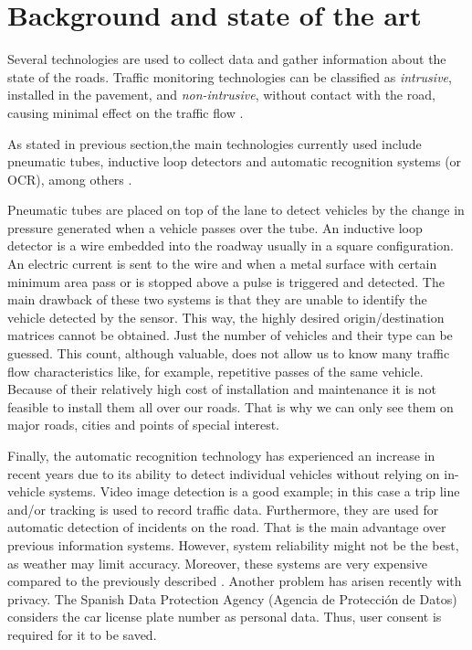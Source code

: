 \documentclass[preprint]{elsarticle}
\begin{document}


\section{Background and state of the art}
\label{sec:soa}

Several technologies are used to collect data and gather information about the 
state of the roads. Traffic monitoring technologies can be classified as 
\textit{intrusive}, installed in the pavement, and
\textit{non-intrusive}, without contact with the road, causing minimal
effect on the traffic flow \cite{martin2003detector}. 

As stated in previous section,the main technologies currently used include pneumatic tubes, inductive loop detectors and automatic recognition systems (or OCR), among others \cite{rodrigue2013geography}.

Pneumatic tubes are placed on top of the lane to detect vehicles by the change 
in pressure generated when a vehicle passes over the tube. 
An inductive loop detector is a wire embedded into the roadway usually
in a square configuration. An electric current is sent to the wire and
when a metal surface with certain minimum area pass or is stopped
above a pulse is triggered and detected. The main drawback of these
two systems is that they are unable to identify the vehicle detected
by the sensor. This way, the highly desired origin/destination
matrices cannot be obtained. Just the number of vehicles and their
type can be guessed. This count, although valuable, does not allow us
to know many traffic flow characteristics like, for example,
repetitive passes of the same vehicle. Because of their relatively
high cost of installation and maintenance it is not feasible to
install them all over our roads. That is why we can only see them on
major roads, cities and points of special interest. 

Finally, the automatic recognition technology has experienced an increase in 
recent years due to its ability to detect individual vehicles without relying 
on in-vehicle systems. Video image detection is a good example; in this case a 
trip line and/or tracking is used to record traffic data. Furthermore, they 
are used for automatic detection of incidents on the road. That is the main 
advantage over previous information systems. However, system reliability might 
not be the best, as weather may limit accuracy. Moreover, these systems are 
very expensive compared to the previously described \cite{skszek2001state}. 
Another problem has arisen recently with privacy. The Spanish Data Protection 
Agency (Agencia de Protección de Datos) considers the car license plate number 
as personal data. Thus, user consent is required for it to be saved.
\end{document}
